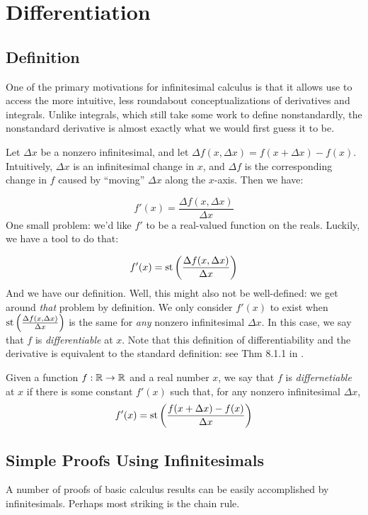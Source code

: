 \section{Differentiation}
\subsection{Definition}
One of the primary motivations for infinitesimal calculus is that it allows use to access the more intuitive, less roundabout conceptualizations of derivatives and integrals. Unlike integrals, which still take some work to define nonstandardly, the nonstandard derivative is almost exactly what we would first guess it to be.

Let $\Delta x$ be a nonzero infinitesimal, and let $\Delta f (x, \Delta x) = f(x + \Delta x) - f(x)$. Intuitively, $\Delta x$ is an infinitesimal change in $x$, and $\Delta f$ is the corresponding change in $f$ caused by ``moving'' $\Delta x$ along the $x$-axis. Then we have:

\[ f'(x) = \frac{\Delta f(x, \Delta x)}{\Delta x} \]
One small problem: we'd like $f'$ to be a real-valued function on the reals. Luckily, we have a tool to do that:

\[ f'(x) = \operatorname{st}\left(\frac{\Delta f(x, \Delta x)}{\Delta x}\right) \]
And we have our definition. Well, this might also not be well-defined: we get around \textit{that} problem by definition. We only consider $f'(x)$ to exist when $\operatorname{st}\left(\frac{\Delta f(x, \Delta x)}{\Delta x}\right)$ is the same for \textit{any} nonzero infinitesimal $\Delta x$. In this case, we say that $f$ is \textit{differentiable} at $x$. Note that this definition of differentiability and the derivative is equivalent to the standard definition: see Thm 8.1.1 in \cite{goldblatt1998}.               

\begin{defn}
    Given a function $f: \mathbb{R} \to \mathbb{R}$ and a real number $x$, we say that $f$ is \textit{differnetiable} at $x$ if there is some constant $f'(x)$ such that, for any nonzero infinitesimal $\Delta x$,
    \[f'(x) = \operatorname{st}\left(\frac{f(x + \Delta x) - f(x)}{\Delta x}\right)\]
\end{defn}

\subsection{Simple Proofs Using Infinitesimals}
A number of proofs of basic calculus results can be easily accomplished by infinitesimals. Perhaps most striking is the chain rule.

